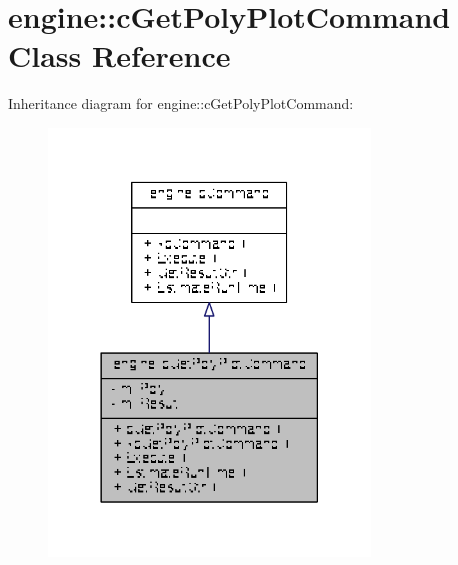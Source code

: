 \hypertarget{classengine_1_1cGetPolyPlotCommand}{\section{engine\-:\-:c\-Get\-Poly\-Plot\-Command Class Reference}
\label{classengine_1_1cGetPolyPlotCommand}
}


Inheritance diagram for engine\-:\-:c\-Get\-Poly\-Plot\-Command\-:
\nopagebreak
\begin{figure}[H]
\begin{center}
\leavevmode
\includegraphics[width=242pt]{classengine_1_1cGetPolyPlotCommand__inherit__graph}
\end{center}
\end{figure}


